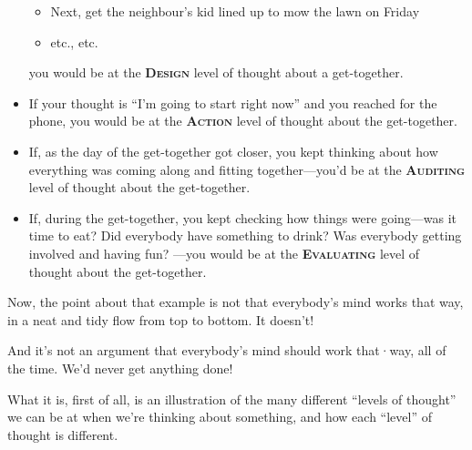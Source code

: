 \documentclass[a5paper]{article}
\begin{document}
\begin{itemize}
\begin{itemize}
      \item Next, get the neighbour's kid lined up to mow the lawn on Friday
      \item etc., etc.
    \end{itemize}
    you would be at the \textbf{\scshape Design} level of thought about a get-together.
  \item If your thought is ``I'm going to start right now'' and you reached for the phone, you would be at the \textbf{\scshape Action} level of thought about the get-together.
  \item If, as the day of the get-together got closer, you kept thinking about how everything was coming along and fitting together---you'd be at the \textbf{\scshape Auditing} level of thought about the get-together.
  \item If, during the get-together, you kept checking how things were going---was it time to eat?
    Did everybody have something to drink?
    Was everybody getting involved and having fun?
   ---you would be at the \textbf{\scshape Evaluating} level of thought about the get-together.
\end{itemize}
Now, the point about that example is not that everybody's mind works that way, in a neat and tidy flow from top to bottom.
It doesn't!

And it's not an argument that everybody's mind should work that·way, all of the time.
We'd never get anything done!

What it is, first of all, is an illustration of the many different ``levels of thought'' we can be at when we're thinking about something, and how each ``level'' of thought is different.
\end{document}
